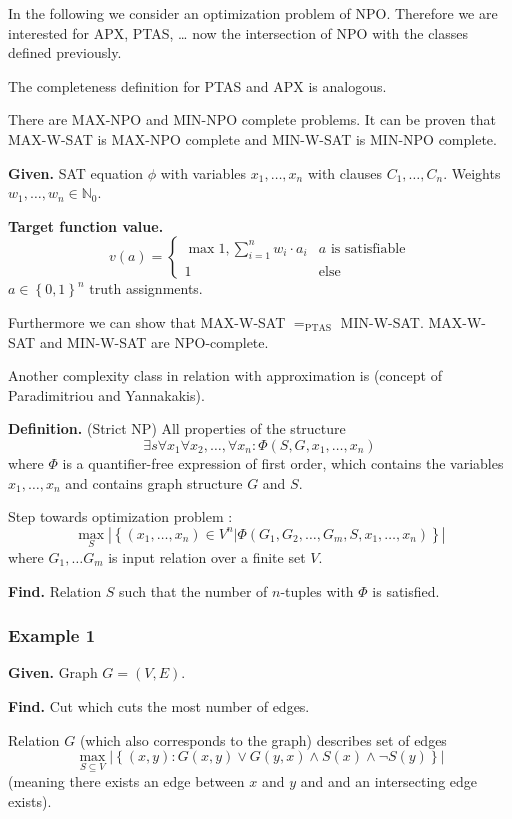\documentclass[a4paper]{article}
\newcommand{\given}[1]{\textbf{Given.} #1\par}
\newcommand{\find}[1]{\textbf{Find.} #1\par}
\newcommand{\cls}[1]{\rm{#1}}
\newcommand{\probl}[1]{\text{\textsc{#1}}}
\newcommand{\set}[1]{\left\{#1\right\}}
\newenvironment{spec}[0]{\begin{framed}}{\end{framed}}
\begin{document}
In the following we consider an optimization problem of \cls{NP}O.
Therefore we are interested for APX, PTAS, \dots{} now the intersection
of \cls{NP}O with the classes defined previously.

The completeness definition for PTAS and APX is analogous.

There are MAX-NPO and MIN-NPO complete problems. It can be proven
that MAX-W-SAT is MAX-NPO complete and MIN-W-SAT is MIN-NPO complete.

\textbf{Given.} SAT equation $\phi$ with variables $x_1, \ldots, x_n$
  with clauses $C_1, \ldots, C_n$. Weights $w_1, \ldots, w_n \in \mathbb{N}_0$.

\textbf{Target function value.}
  \[
    v(a) = \begin{cases}
      \max{1, \sum_{i=1}^n w_i \cdot a_i}  & a \text{ is satisfiable} \\
      1 & \text{else}
    \end{cases}
  \]
  $a \in \set{0,1}^n$ truth assignments.

Furthermore we can show that MAX-W-SAT $=_{\text{PTAS}}$ MIN-W-SAT.
MAX-W-SAT and MIN-W-SAT are \cls{NP}O-complete.

Another complexity class in relation with approximation is \probl{MaxSNP}
(concept of Paradimitriou and Yannakakis).

\textbf{Definition.} (Strict \cls{NP})
  All properties of the structure
  \[
    \exists s \forall x_1 \forall x_2, \ldots, \forall x_n:
    \Phi(S, G, x_1, \ldots, x_n)
  \]
  where $\Phi$ is a quantifier-free expression of first order, which contains
  the variables $x_1, \ldots, x_n$ and contains graph structure $G$ and $S$.

Step towards optimization problem \probl{MaxSNP}:
\[
  \max_S \left|
    \set{(x_1, \ldots, x_n) \in V^n | \Phi(G_1, G_2, \ldots, G_m, S, x_1, \ldots, x_n)}
  \right|
\]
where $G_1, \ldots G_m$ is input relation over a finite set $V$.

\textbf{Find.} Relation $S$ such that the number of $n$-tuples
  with $\Phi$ is satisfied.

\subsubsection{Example 1}
%
\begin{spec}
  \given{Graph $G = (V, E)$.}
  \find{Cut which cuts the most number of edges.}
\end{spec}

Relation $G$ (which also corresponds to the graph) describes set of edges
\[
  \max_{S \subseteq V} \left|
    \set{(x, y) : G(x, y) \lor G(y, x) \land S(x) \land \neg S(y)}
  \right|
\]
(meaning there exists an edge between $x$ and $y$ and
and an intersecting edge exists).
\end{document}
